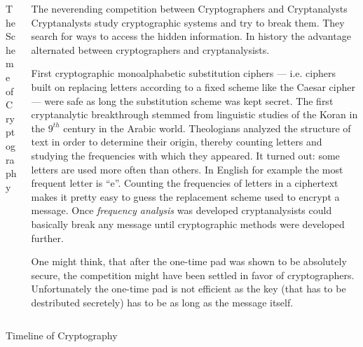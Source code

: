 \documentclass[final,hyperref={pdfpagelabels=false}]{beamer}
\begin{document}
\begin{frame}{}
\begin{columns}[t]
\begin{column}{.48\linewidth}
\begin{block}{\large The Scheme of Cryptography}
\begin{figure}
\begin{tikzpicture}[scale=0.8]
      \end{tikzpicture}
    \end{figure}
    \end{block}
    \end{column}
    \begin{column}{.48\linewidth}
      \begin{block}{\large The neverending competition between Cryptographers and Cryptanalysts}
        Cryptanalysts study cryptographic systems and try to break them. They search for ways to access the hidden information. In history the advantage alternated between cryptographers and cryptanalysists. 
        \par First cryptographic monoalphabetic substitution ciphers --- i.e. ciphers built on replacing letters according to a fixed scheme like the Caesar cipher --- were safe as long the substitution scheme was kept secret. The first cryptanalytic breakthrough stemmed from linguistic studies of the Koran in the $9^{th}$ century in the Arabic world. Theologians analyzed the structure of text in order to determine their origin, thereby counting letters and studying the frequencies with which they appeared. It turned out: some letters are used more often than others. In English for example the most frequent letter is ``e''. Counting the frequencies of letters in a ciphertext makes it pretty easy to guess the replacement scheme used to encrypt a message. Once {\em frequency analysis} was developed cryptanalysists could basically break any message until cryptographic methods were developed further.
        \par One might think, that after the one-time pad was shown to be absolutely secure, the competition might have been settled in favor of cryptographers. Unfortunately the one-time pad is not efficient as the key (that has to be destributed secretely) has to be as long as the message itself.
      \end{block}
    \end{column}
    \end{columns}
    \vfill
    \vfill
    \begin{block}{\large Timeline of Cryptography}
      \begin{figure}
      \centering
\end{figure}
\end{block}
\end{frame}
\end{document}
